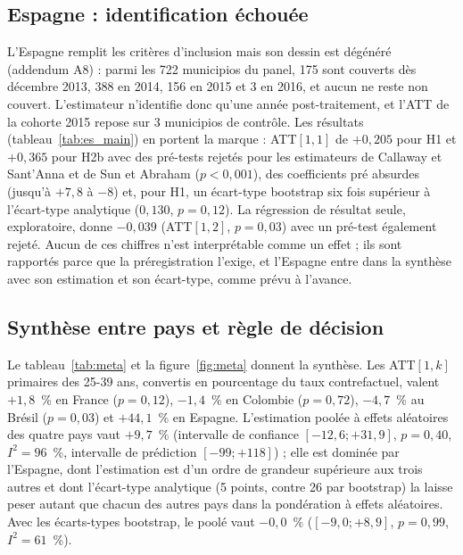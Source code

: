 \documentclass[11pt,a4paper]{article}
\begin{document}
\subsection{Espagne : identification échouée}

L'Espagne remplit les critères d'inclusion mais son dessin est dégénéré (addendum A8) : parmi les 722 municipios du panel, 175 sont couverts dès décembre 2013, 388 en 2014, 156 en 2015 et 3 en 2016, et aucun ne reste non couvert. L'estimateur n'identifie donc qu'une année post-traitement, et l'ATT de la cohorte 2015 repose sur 3 municipios de contrôle. Les résultats (tableau~\ref{tab:es_main}) en portent la marque : ATT$[1,1]$ de $+0{,}205$ pour H1 et $+0{,}365$ pour H2b avec des pré-tests rejetés pour les estimateurs de Callaway et Sant'Anna et de Sun et Abraham ($p < 0{,}001$), des coefficients pré absurdes (jusqu'à $+7{,}8$ à $-8$) et, pour H1, un écart-type bootstrap six fois supérieur à l'écart-type analytique ($0{,}130$, $p = 0{,}12$). La régression de résultat seule, exploratoire, donne $-0{,}039$ (ATT$[1,2]$, $p = 0{,}03$) avec un pré-test également rejeté. Aucun de ces chiffres n'est interprétable comme un effet ; ils sont rapportés parce que la préregistration l'exige, et l'Espagne entre dans la synthèse avec son estimation et son écart-type, comme prévu à l'avance.



\subsection{Synthèse entre pays et règle de décision}

Le tableau~\ref{tab:meta} et la figure~\ref{fig:meta} donnent la synthèse. Les ATT$[1,k]$ primaires des 25-39 ans, convertis en pourcentage du taux contrefactuel, valent $+1{,}8$~\% en France ($p = 0{,}12$), $-1{,}4$~\% en Colombie ($p = 0{,}72$), $-4{,}7$~\% au Brésil ($p = 0{,}03$) et $+44{,}1$~\% en Espagne. L'estimation poolée à effets aléatoires des quatre pays vaut $+9{,}7$~\% (intervalle de confiance $[-12{,}6 ; +31{,}9]$, $p = 0{,}40$, $I^2 = 96$~\%, intervalle de prédiction $[-99 ; +118]$) ; elle est dominée par l'Espagne, dont l'estimation est d'un ordre de grandeur supérieure aux trois autres et dont l'écart-type analytique (5 points, contre 26 par bootstrap) la laisse peser autant que chacun des autres pays dans la pondération à effets aléatoires. Avec les écarts-types bootstrap, le poolé vaut $-0{,}0$~\% ($[-9{,}0 ; +8{,}9]$, $p = 0{,}99$, $I^2 = 61$~\%).
\end{document}
